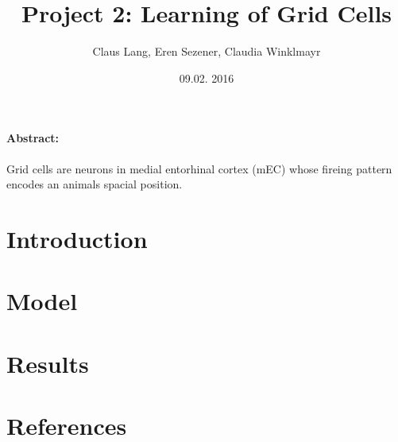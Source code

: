 \documentclass[a4paper, 12pt]{article}
\title{Project 2: Learning of Grid Cells}
\author{Claus Lang, Eren Sezener, Claudia Winklmayr}
\date{09.02. 2016}
\begin{document}
\maketitle

\paragraph{Abstract:}
Grid cells are neurons in medial entorhinal cortex (mEC) whose fireing pattern encodes an animals spacial position.
\section{Introduction}
\section{Model}
\section{Results}
\section{References}
\end{document}
